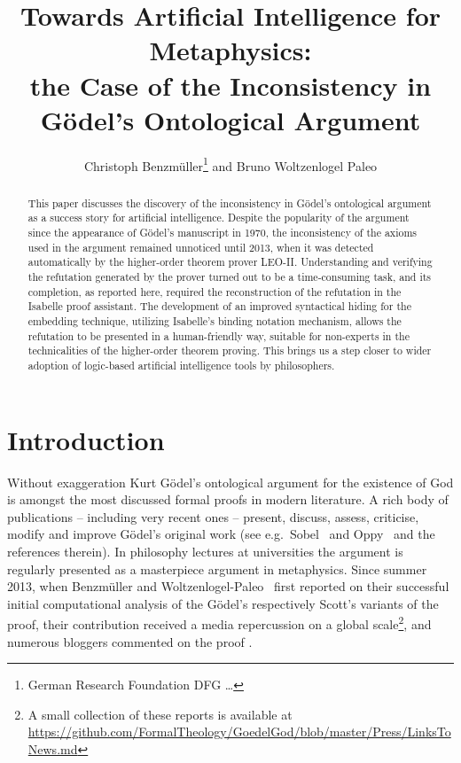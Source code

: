 \documentclass{article}
\title{Towards Artificial Intelligence for Metaphysics: \\ the Case of the Inconsistency in G\"odel's Ontological Argument}
\author{Christoph Benzm\"uller\thanks{German Research Foundation DFG \ldots} and Bruno Woltzenlogel Paleo}
\author{}
\begin{document}
\maketitle

\begin{abstract}
  This paper discusses the discovery of the inconsistency in G\"odel's ontological argument as a success story for artificial intelligence. Despite the popularity of the argument since the appearance of G\"odel's manuscript in 1970, the inconsistency of the axioms used in the argument remained unnoticed until 2013, when it was detected automatically by the higher-order theorem prover LEO-II. Understanding and verifying the refutation generated by the prover turned out to be a time-consuming task, and its completion, as reported here, required the reconstruction of the refutation in the Isabelle proof assistant. The development of an improved syntactical hiding for the embedding technique, utilizing Isabelle's binding notation mechanism, allows the refutation to be presented in a human-friendly way, suitable for non-experts in the technicalities of the higher-order theorem proving. This brings us a step closer to wider adoption of logic-based artificial intelligence tools by philosophers.
\end{abstract}


\section{Introduction}
Without exaggeration Kurt G\"{o}del's ontological
argument for the existence of God \cite{GoedelNotes,ScottNotes} is
amongst the most discussed formal proofs in modern literature. A rich
body of publications -- including very recent ones -- present,
discuss, assess, criticise, modify and improve G\"{o}del's original
work (see e.g.~Sobel~ and Oppy~ and the
references therein).  In philosophy lectures at universities the
argument is regularly presented as a masterpiece argument in
metaphysics. Since summer 2013, when Benzm\"uller and Woltzenlogel-Paleo~ first
reported on their successful initial computational
analysis of the G\"odel's respectively Scott's variants of the proof,
their contribution received a media repercussion on a global scale\footnote{A
  small collection of these reports is available at {\scriptsize
    \url{https://github.com/FormalTheology/GoedelGod/blob/master/Press/LinksToNews.md}}},
and numerous bloggers commented on the proof
\cite{fuhrmann15:_blogg_goedel}.
\end{document}
